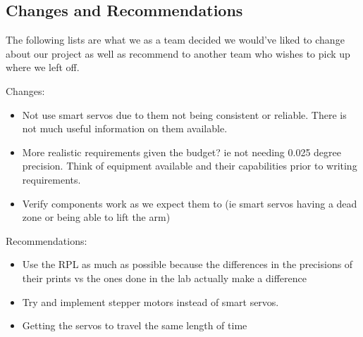 \subsection*{Changes and Recommendations}
The following lists are what we as a team decided we would've liked to change about our project as well as recommend to another team who wishes to pick up where we left off.

Changes:
\begin{itemize}
  \item Not use smart servos due to them not being consistent or reliable. There is not much useful information on them available.
  \item More realistic requirements given the budget? ie not needing 0.025 degree precision. Think of equipment available and their capabilities prior to writing requirements.
  \item Verify components work as we expect them to (ie smart servos having a dead zone or being able to lift the arm)
\end{itemize}

Recommendations:
\begin{itemize}
  \item Use the RPL as much as possible because the differences in the precisions of their prints vs the ones done in the lab actually make a difference
  \item Try and implement stepper motors instead of smart servos.
  \item Getting the servos to travel the same length of time
\end{itemize}
